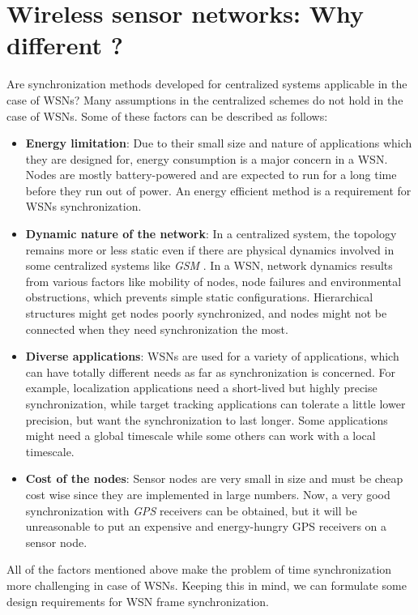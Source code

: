 \documentclass[a4paper,10pt]{report}
\begin{document}
\section{\textbf{Wireless sensor networks: Why different ?}}
Are synchronization methods developed for centralized systems applicable in the case of WSNs? Many assumptions in the centralized schemes do not hold in the case of WSNs. Some of these factors can be described as follows:
\begin{itemize}
\item \textbf{Energy limitation}: Due to their small size and nature of applications which they are designed for, energy consumption is a major concern in a WSN. Nodes are mostly battery-powered and are expected to run for a long time before they run out of power. An energy efficient method is a requirement for WSNs synchronization.
\item \textbf{Dynamic nature of the network}: In a centralized system, the topology remains more or less static even if there are physical
dynamics involved  in some centralized systems like \textit{GSM} . In a WSN, network dynamics results from various factors like mobility of nodes, node failures and environmental obstructions, which prevents simple static configurations. Hierarchical structures might get nodes poorly synchronized, and nodes might not be connected when they need
synchronization the most.
\item \textbf{Diverse applications}: WSNs are used for a variety of applications, which can have totally different needs as far as synchronization is concerned. For example, localization applications need a short-lived but highly
precise synchronization, while target tracking applications can tolerate a little lower precision, but want the synchronization to
last longer. Some applications might need a global timescale while some others can work with a local timescale.
\item \textbf{Cost of the nodes}: Sensor nodes are very small in size and must be cheap cost wise since they are implemented in large
numbers. Now, a very good synchronization with \textit{GPS} receivers can be obtained, but it will be unreasonable to put an expensive and energy-hungry GPS receivers on a sensor node.
\end{itemize}
All of the factors mentioned above make the problem of time synchronization more challenging in case of WSNs. Keeping this in mind, we can formulate some design requirements for WSN frame synchronization.
\end{document}

